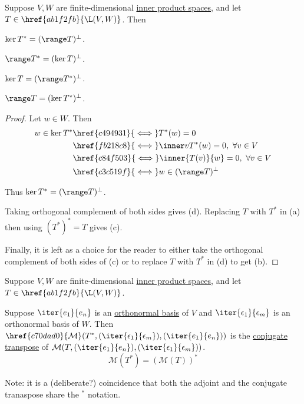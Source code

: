 \label{e049649}

Suppose $V,W$ are finite-dimensional \href{b9935c8}{inner product spaces}, and
let $T\in\href{ab1f2fb}{\L(V,W)}$. Then
\begin{enumerata}
  \item $\ker T^*=(\range T)^\perp$.
  \item $\range T^*=(\ker T)^\perp$.
  \item $\ker T=(\range T^*)^\perp$.
  \item $\range T=(\ker T^*)^\perp$.
\end{enumerata}

\begin{proof}
   Let $w\in W$. Then
  \begin{align*}
    w\in\ker T^* &\href{c494931}{\iff}T^*(w)=0                            \\
                 &\href{fb218c8}{\iff}\inner v{T^*(w)}=0,\ \forall v\in V \\
                 &\href{c84f503}{\iff}\inner{T(v)}{w}=0,\ \forall v\in V  \\
                 &\href{c3c519f}{\iff}w\in(\range T)^\perp
  \end{align*}

  Thus $\ker T^*=(\range T)^\perp$.

  Taking orthogonal complement of both sides gives (d). Replacing $T$ with
  $T^*$ in (a) then using \href{ea24684}{$(T^*)^*=T$} gives (c).

  Finally, it is left as a choice for the reader to either take the orthogonal
  complement of both sides of (c) or to replace $T$ with $T^*$ in (d) to get
  (b).
\end{proof}

\label{ed8da51}

Suppose $V,W$ are finite-dimensional \href{b9935c8}{inner product spaces}, and
let $T\in\href{ab1f2fb}{\L(V,W)}$.

Suppose $\iter{e_1}{e_n}$ is an \href{e112aa0}{orthonormal basis} of $V$ and
$\iter{\epsilon_1}{\epsilon_m}$ is an orthonormal basis of $W$. Then
$\href{c70dad0}{\mathcal
M}(T^*,(\iter{\epsilon_1}{\epsilon_m}),(\iter{e_1}{e_n}))$ is the
\href{abdc1e4}{conjugate transpose} of $\mathcal
M(T,(\iter{e_1}{e_n}),(\iter{\epsilon_1}{\epsilon_m}))$.
$$
  \mathcal M(T^*)=(\mathcal M(T))^*
$$

Note: it is a (deliberate?) coincidence that both the adjoint and the conjugate
tranaspose share the $^*$ notation.


